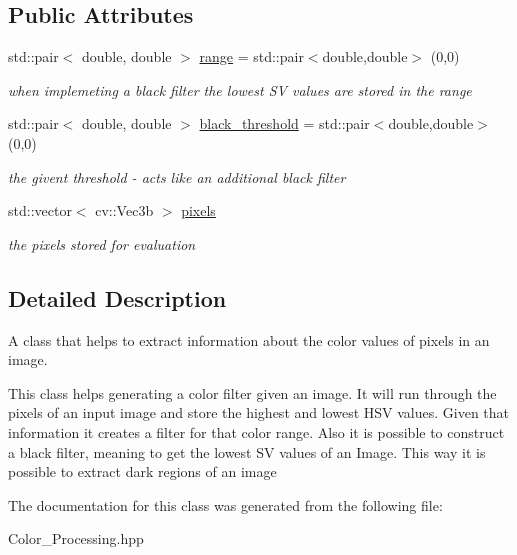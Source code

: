 \subsection*{Public Attributes}
\begin{DoxyCompactItemize}
\item 
\mbox{\label{class_image_processing_1_1_color___processing_a8a027ab4f4c0a4736ff78785c172affd}} 
std\+::pair$<$ double, double $>$ \mbox{\hyperlink{class_image_processing_1_1_color___processing_a8a027ab4f4c0a4736ff78785c172affd}{range}} = std\+::pair$<$double,double$>$ (0,0)
\begin{DoxyCompactList}\small\item\em when implemeting a black filter the lowest SV values are stored in the range \end{DoxyCompactList}\item 
\mbox{\label{class_image_processing_1_1_color___processing_a42ac41f06222b9175e029516e39d24d9}} 
std\+::pair$<$ double, double $>$ \mbox{\hyperlink{class_image_processing_1_1_color___processing_a42ac41f06222b9175e029516e39d24d9}{black\+\_\+threshold}} = std\+::pair$<$double,double$>$ (0,0)
\begin{DoxyCompactList}\small\item\em the givent threshold -\/ acts like an additional black filter \end{DoxyCompactList}\item 
\mbox{\label{class_image_processing_1_1_color___processing_a0f409e933954d9a45d82886264842529}} 
std\+::vector$<$ cv\+::\+Vec3b $>$ \mbox{\hyperlink{class_image_processing_1_1_color___processing_a0f409e933954d9a45d82886264842529}{pixels}}
\begin{DoxyCompactList}\small\item\em the pixels stored for evaluation \end{DoxyCompactList}\end{DoxyCompactItemize}


\subsection{Detailed Description}
A class that helps to extract information about the color values of pixels in an image. 

This class helps generating a color filter given an image. It will run through the pixels of an input image and store the highest and lowest H\+SV values. Given that information it creates a filter for that color range. Also it is possible to construct a black filter, meaning to get the lowest SV values of an Image. This way it is possible to extract dark regions of an image 

The documentation for this class was generated from the following file\+:\begin{DoxyCompactItemize}
\item 
Color\+\_\+\+Processing.\+hpp\end{DoxyCompactItemize}

